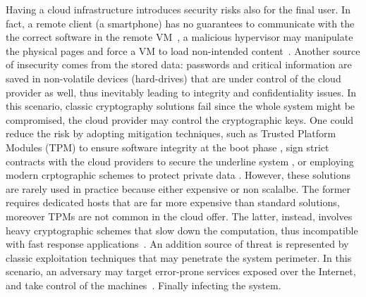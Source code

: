 Having a cloud infrastructure introduces security risks also for the final 
user. In fact, a remote client (\eg a smartphone) has no guarantees to 
communicate with the the correct software in the remote 
VM~\citep{beekman2016attestation}, \eg a malicious hypervisor may manipulate 
the physical pages and force a VM to load non-intended 
content~\citep{10.1145/3292006.3300022}.
Another source of insecurity comes from the stored data: passwords and critical 
information are saved in non-volatile devices (\ie hard-drives) that are under 
control of the cloud provider as well, thus inevitably leading to integrity and 
confidentiality issues.
In this scenario, classic cryptography solutions fail since the whole system 
might be compromised, \ie the cloud provider may control the cryptographic keys.
%
One could reduce the risk by adopting mitigation techniques, such as 
Trusted Platform Modules (TPM) to ensure software integrity at the boot phase 
\citep{tpm-isoosi}, sign strict contracts with the cloud providers to secure 
the underline system \citep{aws_dedicated_host}, or employing modern 
crptographic schemes to protect private data \citep{gentry2009fully}.
%
However, these solutions are rarely used in practice because either expensive 
or non scalalbe. The former requires dedicated hosts that are far more 
expensive than standard solutions, moreover TPMs are not common in the cloud 
offer. 
The latter, instead, involves heavy cryptographic schemes that slow down the 
computation, thus incompatible with fast response 
applications~\citep{10.1145/2046660.2046682}.
%
An addition source of threat is represented by classic exploitation techniques 
that may penetrate the system perimeter.
In this scenario, an adversary may target error-prone services exposed over the 
Internet, and take control of the
machines~\citep{van2012memory,10.1145/2810103.2813646}.
Finally infecting the system.

